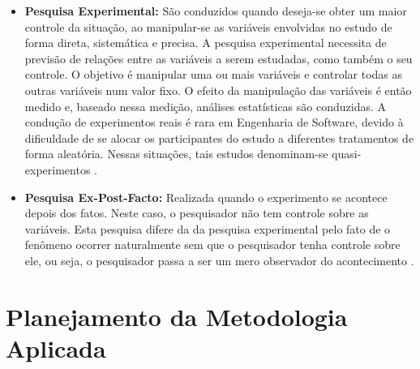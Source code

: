 \begin{itemize}
\begin{itemize}
			\item \textbf{Pesquisa Experimental:} São conduzidos quando deseja-se obter um maior controle da situação, ao manipular-se as variáveis envolvidas no estudo de forma direta, sistemática e precisa. A pesquisa experimental necessita de previsão de relações entre as variáveis a serem estudadas, como também o seu controle. O objetivo é manipular uma ou mais variáveis e controlar todas as outras variáveis num valor fixo. O efeito da manipulação das variáveis é então medido e, baseado nessa medição, análises estatísticas são conduzidas. A condução de experimentos reais é rara em Engenharia de Software, devido à dificuldade de se alocar os participantes do estudo a diferentes tratamentos de forma aleatória. Nessas situações, tais estudos denominam-se quasi-experimentos \cite{Mafra:Travassos:2006}.
			
			\item \textbf{Pesquisa Ex-Post-Facto:} Realizada quando o experimento se acontece depois dos fatos. Neste caso, o pesquisador não tem controle sobre as variáveis. Esta pesquisa difere da da pesquisa experimental pelo fato de o fenômeno ocorrer naturalmente sem que o pesquisador tenha controle sobre ele, ou seja, o pesquisador passa a ser um mero observador do acontecimento \cite{Silva:Tafner:2007}.
		\end{itemize}

\end{itemize}



\section{Planejamento da Metodologia Aplicada}
